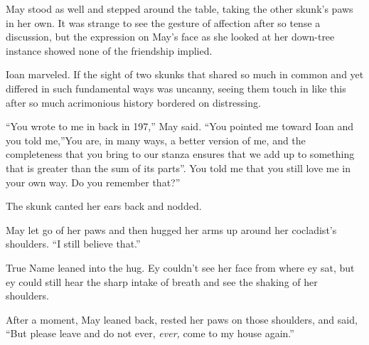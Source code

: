 May stood as well and stepped around the table, taking the other skunk's paws in her own. It was strange to see the gesture of affection after so tense a discussion, but the expression on May's face as she looked at her down-tree instance showed none of the friendship implied.

Ioan marveled. If the sight of two skunks that shared so much in common and yet differed in such fundamental ways was uncanny, seeing them touch in like this after so much acrimonious history bordered on distressing.

``You wrote to me in back in 197,'' May said. ``You pointed me toward Ioan and you told me,''You are, in many ways, a better version of me, and the completeness that you bring to our stanza ensures that we add up to something that is greater than the sum of its parts''. You told me that you still love me in your own way. Do you remember that?''

The skunk canted her ears back and nodded.

May let go of her paws and then hugged her arms up around her cocladist's shoulders. ``I still believe that.''

True Name leaned into the hug. Ey couldn't see her face from where ey sat, but ey could still hear the sharp intake of breath and see the shaking of her shoulders.

After a moment, May leaned back, rested her paws on those shoulders, and said, ``But please leave and do not ever, \emph{ever,} come to my house again.''
